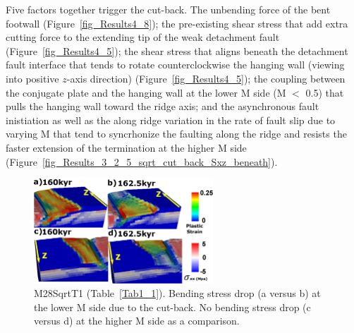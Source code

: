 Five factors together trigger the cut-back. The unbending force of the bent footwall (Figure~\hyperref[fig_Results4_8]{\ref{fig_Results4_8}}); the pre-existing shear stress that add extra cutting force to the extending tip of the weak detachment fault (Figure~\hyperref[fig_Results4_5]{\ref{fig_Results4_5}}); the shear stress that aligns beneath the detachment fault interface that tends to rotate counterclockwise the hanging wall (viewing into positive $z$-axis direction) (Figure~\hyperref[fig_Results4_5]{\ref{fig_Results4_5}}); the coupling between the conjugate plate and the hanging wall at the lower M side (M $<$ 0.5) that pulls the hanging wall toward the ridge axis; and the asynchronous fault inistiation as well as the along ridge variation in the rate of fault slip due to varying M that tend to syncrhonize the faulting along the ridge and resists the faster extension of the termination at the higher M side (Figure~\hyperref[fig_Results_3_2_5_sqrt_cut_back_Sxz_beneath]{\ref{fig_Results_3_2_5_sqrt_cut_back_Sxz_beneath}}).


\begin{figure}[h]
  \centering
    \includegraphics[width=0.6\textwidth]{./Figures/fig_Results4_6_sqrt_cut_back_bending_drop.eps}
  \caption{M28SqrtT1 (Table~\hyperref[Tab1_1]{\ref{Tab1_1}}). Bending stress drop (a versus b) at the lower M side due to the cut-back. No bending stress drop (c versus d) at the higher M side as a comparison.}
 \label{fig_Results4_6}
\end{figure}

